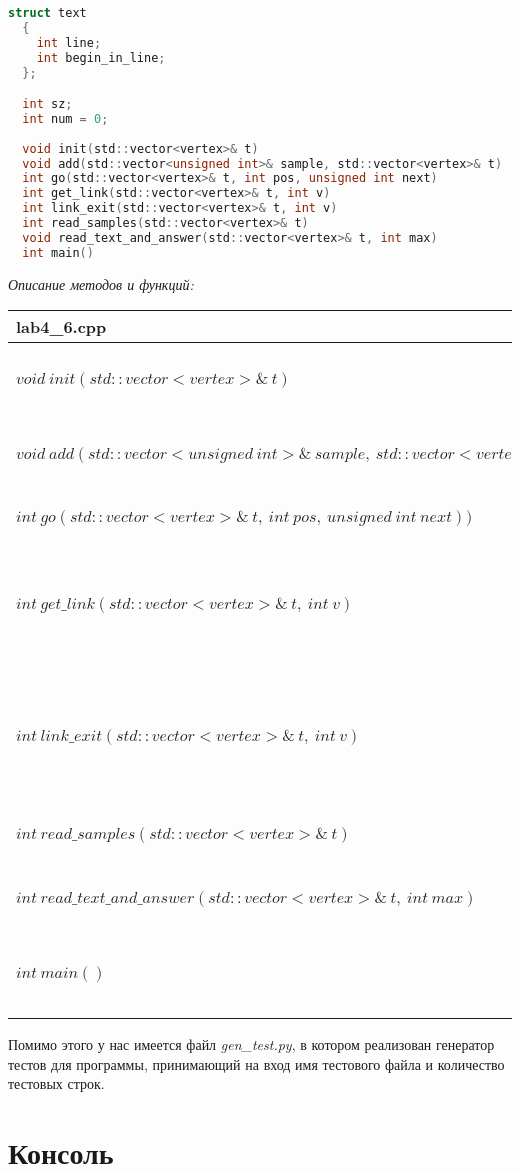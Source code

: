 \documentclass[pdf, unicode, 12pt, a4paper,oneside,fleqn]{article}
\begin{document}
{{\begin{lstlisting}[language=C]
  struct text
  {
    int line;
    int begin_in_line;
  };

  int sz;
  int num = 0;
  
  void init(std::vector<vertex>& t)
  void add(std::vector<unsigned int>& sample, std::vector<vertex>& t)
  int go(std::vector<vertex>& t, int pos, unsigned int next)
  int get_link(std::vector<vertex>& t, int v)
  int link_exit(std::vector<vertex>& t, int v)
  int read_samples(std::vector<vertex>& t)
  void read_text_and_answer(std::vector<vertex>& t, int max)
  int main()

\end{lstlisting}

\pagebreak

{\it Описание методов и функций:}\\
\begin{longtable}{|p{7.5cm}|p{7.5cm}|}
\hline
\rowcolor{lightgray}
\multicolumn{2}{|c|} {lab4_6.cpp}\\
\hline
$void\ init(std::vector<vertex>\&\ t)$&Основная функция работы\\
\hline
$void\ add(std::vector<unsigned\ int>\&\ sample,\ std::vector<vertex>\&\ t)$&Добавление в бор нового образца\\
\hline
$int\ go(std::vector<vertex>\&\ t,\ int\ pos,\ unsigned\ int\ next))$&Переход по бору\\
\hline
$int\ get\_link(std::vector<vertex>\&\ t,\ int\ v)$&Установление суффиксальной ссылки для каждого элемента бора\\
\hline
$int\ link\_exit(std::vector<vertex>\&\ t,\ int\ v)$&Установление " хорошей " суффиксальной ссылки для каждого элемента бора\\
\hline
$int\ read\_samples(std::vector<vertex>\&\ t)$&Считывание образцов\\
\hline
$int\ read\_text\_and\_answer(std::vector<vertex>\&\ t,\ int\ max)$&Считывание текста и печать ответа\\
\hline
$int\ main()$&Основная функция работы\\
\hline
\rowcolor{lightgray}

\end{longtable}

Помимо этого у нас имеется файл {\it gen\_test.py}, в котором реализован генератор тестов для программы, принимающий на вход имя тестового файла и количество тестовых строк.

\pagebreak

\section{Консоль}
\begin{alltt}


\end{alltt}}}
\end{document}
